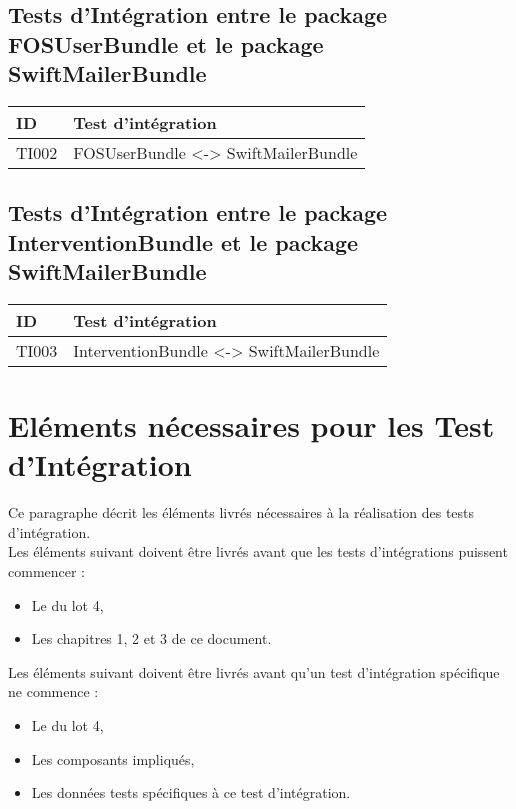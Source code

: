   	
  	\subsection*{Tests d'Intégration entre le package FOSUserBundle et le package SwiftMailerBundle}
 	
 	\begin{center}
    		\begin{tabular}[h]{|p{}|p{}|}
		\hline
			ID & Test d'intégration \\\hline
			TI002 & FOSUserBundle <-> SwiftMailerBundle \\\hline
    	 	\end{tabular}
  	\end{center}
  	
  	\subsection*{Tests d'Intégration entre le package InterventionBundle et le package SwiftMailerBundle}
 	
 	\begin{center}
    		\begin{tabular}[h]{|p{}|p{}|}
		\hline
			ID & Test d'intégration \\\hline
			TI003 & InterventionBundle <-> SwiftMailerBundle \\\hline
    	 	\end{tabular}
  	\end{center}
  	
  	
  	
 	
  \section{Eléments nécessaires pour les Test d'Intégration}
  	Ce paragraphe décrit les éléments livrés nécessaires à la réalisation des tests d'intégration. \\
  	
  	Les éléments suivant doivent être livrés avant que les tests d'intégrations puissent commencer :
  	\begin{itemize}
  		\item Le \PTU du lot 4,
  		\item Les chapitres 1, 2 et 3 de ce document.
  	\end{itemize}
  	
  	Les éléments suivant doivent être livrés avant qu'un test d'intégration spécifique ne commence :
  	\begin{itemize}
  		\item Le \JTU du lot 4,
  		\item Les composants impliqués,
  		\item Les données tests spécifiques à ce test d'intégration.
  	\end{itemize}
  
